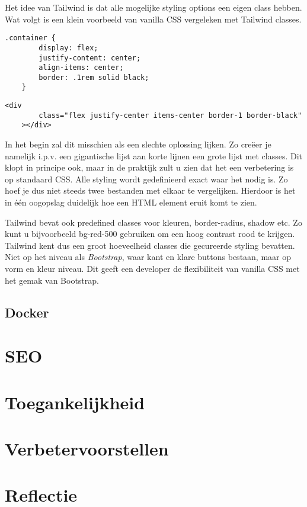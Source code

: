 \documentclass[a4paper]{report}
\begin{document}
    Het idee van Tailwind is dat alle mogelijke styling options een eigen class hebben. Wat volgt is een klein voorbeeld van vanilla CSS vergeleken met Tailwind classes.
    \begin{lstlisting}[caption={A Flexbox container with a border in vanilla CSS}, label=useless, style=css]
    .container {
        display: flex;
        justify-content: center;
        align-items: center;
        border: .1rem solid black;
    }
    \end{lstlisting}
    \begin{lstlisting}[caption={The same container using Tailwind classes}, label=useless, style=css]
    <div
        class="flex justify-center items-center border-1 border-black"
    ></div>
    \end{lstlisting}

    In het begin zal dit misschien als een slechte oplossing lijken. Zo creëer je namelijk i.p.v. een gigantische lijst aan korte lijnen een grote lijst met classes.
    Dit klopt in principe ook, maar in de praktijk zult u zien dat het een verbetering is op standaard CSS. Alle styling wordt gedefinieerd exact waar het nodig is.
    Zo hoef je dus niet steeds twee bestanden met elkaar te vergelijken. Hierdoor is het in één oogopslag duidelijk hoe een HTML element eruit komt te zien.

    Tailwind bevat ook predefined classes voor kleuren, border-radius, shadow etc. Zo kunt u bijvoorbeeld {\selectfont bg-red-500} gebruiken
    om een hoog contrast rood te krijgen. Tailwind kent dus een groot hoeveelheid classes die gecureerde styling bevatten. Niet op het niveau als
    \textit{Bootstrap}, waar kant en klare buttons bestaan, maar op vorm en kleur niveau. Dit geeft een developer de flexibiliteit van vanilla CSS
    met het gemak van Bootstrap.

    \section{Docker}

    \chapter{SEO}

    \chapter{Toegankelijkheid}

    \chapter{Verbetervoorstellen}

    \chapter{Reflectie}

    \printbibliography
\end{document}
